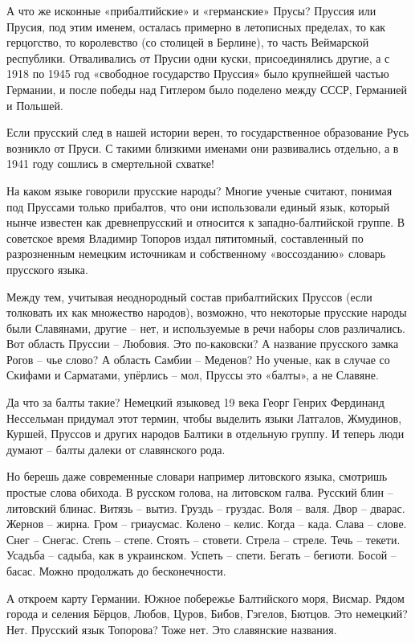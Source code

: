 А что же исконные «прибалтийские» и «германские» Прусы? Пруссия или Прусия, под этим именем, осталась примерно в летописных пределах, то как герцогство, то королевство (со столицей в Берлине), то часть Веймарской республики. Отваливались от Прусии одни куски, присоединялись другие, а с 1918 по 1945 год «свободное государство Пруссия» было крупнейшей частью Германии, и после победы над Гитлером было поделено между СССР, Германией и Польшей.

Если прусский след в нашей истории верен, то
государственное образование Русь возникло от Пруси. С такими близкими именами они развивались отдельно, а в 1941 году сошлись в смертельной схватке!

На каком языке говорили прусские народы? Многие ученые считают, понимая под Пруссами только прибалтов, что они использовали единый язык, который нынче известен как древнепрусский и относится к западно-балтийской группе. В советское время Владимир Топоров издал пятитомный, составленный по разрозненным немецким источникам и собственному «воссозданию» словарь прусского языка.

Между тем, учитывая неоднородный состав прибалтийских Пруссов (если толковать их как множество народов), возможно, что некоторые прусские народы были Славянами, другие – нет, и используемые в речи наборы слов различались. Вот область Пруссии – Любовия. Это по-каковски? А название прусского замка Рогов – чье слово? А область Самбии – Меденов? Но ученые, как в случае со Скифами и Сарматами, упёрлись – мол, Пруссы это «балты», а не Славяне.

Да что за балты такие? Немецкий языковед 19 века Георг Генрих Фердинанд Нессельман придумал этот термин, чтобы выделить языки Латгалов, Жмудинов, Куршей, Пруссов и других народов Балтики в отдельную группу. И теперь люди думают – балты далеки от славянского рода.

Но берешь даже современные словари например литовского языка, смотришь простые слова обихода. В русском голова, на литовском галва. Русский блин – литовский блинас. Витязь – вытиз. Груздь – груздас. Воля – валя. Двор – дварас. Жернов – жирна. Гром – гриаусмас. Колено – келис. Когда – када. Слава – слове. Снег – Снегас. Степь – степе. Стоять – стовети. Стрела – стреле. Течь – текети. Усадьба – садыба, как в украинском. Успеть – спети. Бегать – бегиоти. Босой – басас. Можно продолжать до бесконечности.

А откроем карту Германии. Южное побережье Балтийского моря, Висмар. Рядом города и селения Бёрцов, Любов, Цуров, Бибов, Гэгелов, Бютцов. Это немецкий? Нет. Прусский язык Топорова? Тоже нет. Это славянские названия.

